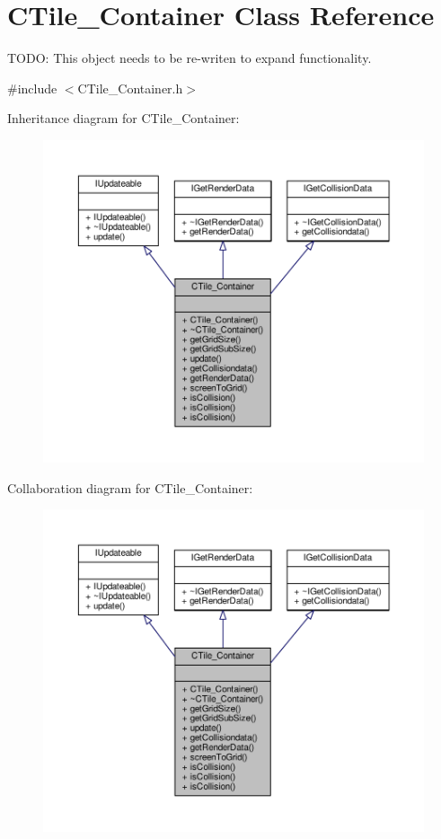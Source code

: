 \hypertarget{classCTile__Container}{\section{C\-Tile\-\_\-\-Container Class Reference}
\label{classCTile__Container}
}


T\-O\-D\-O\-: This object needs to be re-\/writen to expand functionality.  




{\ttfamily \#include $<$C\-Tile\-\_\-\-Container.\-h$>$}



Inheritance diagram for C\-Tile\-\_\-\-Container\-:
\nopagebreak
\begin{figure}[H]
\begin{center}
\leavevmode
\includegraphics[width=350pt]{classCTile__Container__inherit__graph}
\end{center}
\end{figure}


Collaboration diagram for C\-Tile\-\_\-\-Container\-:
\nopagebreak
\begin{figure}[H]
\begin{center}
\leavevmode
\includegraphics[width=350pt]{classCTile__Container__coll__graph}
\end{center}
\end{figure}
